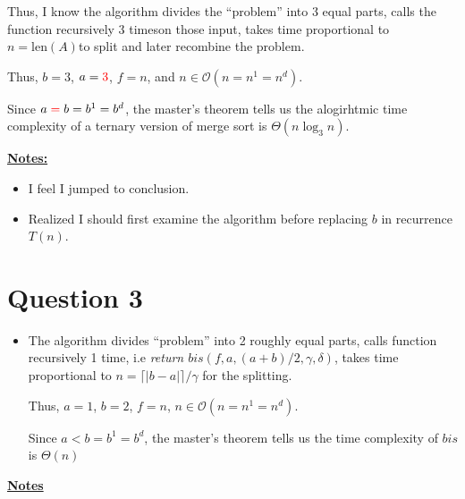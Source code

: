 \documentclass[12pt]{article}
\begin{document}
\begin{itemize}
\begin{mdframed}
        \bigskip

        Thus, I know the algorithm divides the ``problem'' into 3 equal parts, calls
        the function recursively \color{red}3 times\color{black}\:on those input,
        takes time proportional to \color{red}$n = \text{len}(A)$\color{black}\:to
        split and later recombine the problem.

        \bigskip

        Thus, $b = 3$, $a = \color{red}3\color{black}$, $f = n$, and
        $n \in \mathcal{O}(n = n^1 = n^d)$.

        \bigskip

        Since $a \color{red}=\color{black} b = b^1 = b^d$, the master's
        theorem tells us the alogirhtmic time complexity of a ternary version of
        merge sort is \color{red}$\Theta(n\log_3 n)$\color{black}.

    \end{mdframed}
\end{itemize}

\bigskip

\underline{\textbf{Notes:}}

\bigskip

\begin{itemize}
    \item I feel I jumped to conclusion.
    \item Realized I should first examine the algorithm before replacing $b$
    in recurrence $T(n)$.
\end{itemize}

\bigskip

\section*{Question 3}

\bigskip

\begin{itemize}
    \item

    The algorithm divides ``problem'' into 2 roughly equal parts, calls function
    recursively 1 time, i.e \textit{return $bis(f,a,(a+b)/2,\gamma,\delta)$},
    takes time proportional to $n = \lceil \vert b -a \vert \rceil/\gamma$ for
    the splitting.

    \bigskip

    Thus, $a = 1$, $b = 2$, $f = n$, $n \in \mathcal{O}(n = n^1 = n^d)$.

    \bigskip

    Since $a < b = b^1 = b^d$, the master's theorem tells us the time complexity
    of $bis$ is $\Theta(n)$
\end{itemize}

\bigskip

\underline{\textbf{Notes}}
\end{document}

